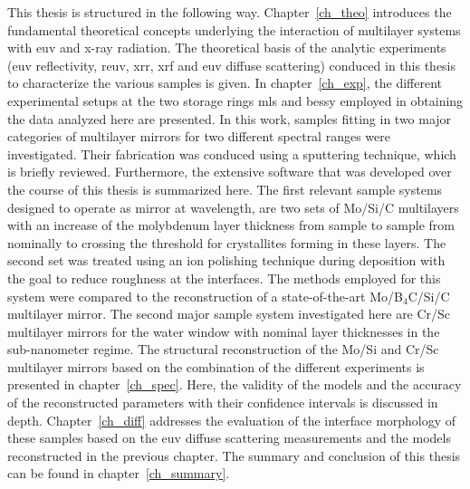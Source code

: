 This thesis is structured in the following way. Chapter~\ref{ch_theo} introduces the fundamental theoretical concepts underlying the interaction of multilayer systems with \gls{euv} and x-ray radiation. The theoretical basis of the analytic experiments (\gls{euv} reflectivity, \gls{reuv}, \gls{xrr}, \gls{xrf} and \gls{euv} diffuse scattering) conduced in this thesis to characterize the various samples is given. In chapter~\ref{ch_exp}, the different experimental setups at the two storage rings \gls{mls} and \gls{bessy} employed in obtaining the data analyzed here are presented. In this work, samples fitting in two major categories of multilayer mirrors for two different spectral ranges were investigated. Their fabrication was conduced using a sputtering technique, which is briefly reviewed. Furthermore, the extensive software that was developed over the course of this thesis is summarized here. The first relevant sample systems designed to operate as mirror at  wavelength, are two sets of Mo/Si/C multilayers with an increase of the  molybdenum layer thickness from sample to sample from nominally  to  crossing the threshold for crystallites forming in these layers. The second set was treated using an ion polishing technique during deposition with the goal to reduce roughness at the interfaces. The methods employed for this system were compared to the reconstruction of a state-of-the-art Mo/B$_4$C/Si/C multilayer mirror. The second major sample system investigated here are Cr/Sc multilayer mirrors for the water window with nominal layer thicknesses in the sub-nanometer regime. The structural reconstruction of the Mo/Si and Cr/Sc multilayer mirrors based on the combination of the different experiments is presented in chapter~\ref{ch_spec}. Here, the validity of the models and the accuracy of the reconstructed parameters with their confidence intervals is discussed in depth. Chapter~\ref{ch_diff} addresses the evaluation of the interface morphology of these samples based on the \gls{euv} diffuse scattering measurements and the models reconstructed in the previous chapter. The summary and conclusion of this thesis can be found in chapter~\ref{ch_summary}.
